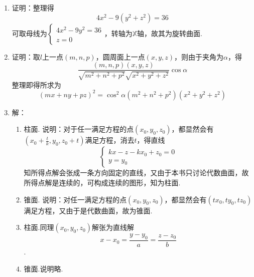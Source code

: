 \documentclass[UTF8]{ctexart}
\begin{document}
\begin{enumerate}
\item 证明：整理得$$4x^2-9\left(y^2+z^2\right)=36$$可取母线为$\left\{\begin{array}{l}4x^2-9y^2=36\\z=0\end{array}\right.$，转轴为$\mathbb{X}$轴，故其为旋转曲面.

\item 证明：取$l$上一点$\left(m,n,p\right)$，圆周面上一点$\left(x,y,z\right)$，则由于夹角为$\alpha$，得$$\frac{\left(m,n,p\right)\left(x,y,z\right)}{\sqrt{m^2+n^2+p^2}\sqrt{x^2+y^2+z^2}}\cos\alpha$$整理即得所求为$$\left(mx+ny+pz\right)^2=\cos^2\alpha\left(m^2+n^2+p^2\right)\left(x^2+y^2+z^2\right)$$

\item 解：\begin{enumerate}[(1)]
\item 柱面. 说明：对于任一满足方程的点$\left(x_0,y_0,z_0\right)$，都显然会有$\left(x_0+\displaystyle\frac{t}{k},y_0,z_0+t\right)$满足方程，消去$t$，得直线$$\left\{\begin{array}{l}kx-z-kx_0+z_0=0\\y=y_0\end{array}\right.$$知所得点解会张成一条方向固定的直线，又由于本书只讨论代数曲面，故所得点解是连续的，可构成连续的图形，知为柱面. 
\item 锥面. 说明：对任一满足方程的点$\left(x_0,y_0,z_0\right)$，都显然会有$\left(tx_0,ty_0,tz_0\right)$满足方程，又由于是代数曲面，故为锥面. 
\item 柱面.同理$\left(x_0,y_0,z_0\right)$解张为直线解$$x-x_0=\frac{y-y_0}{a}=\frac{z-z_0}{b}$$.
\item 锥面.说明略. 
\end{enumerate}

\end{enumerate}


\end{document}
